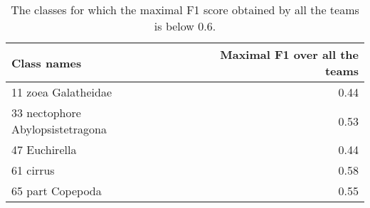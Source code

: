 
\begin{table}
\begin{tabular}{|l|r|}
Class names & Maximal F1 over all the teams \\
        \hline
11 zoea Galatheidae & 0.44\\ 
33 nectophore Abylopsistetragona & 0.53\\ 
47 Euchirella & 0.44\\ 
61 cirrus & 0.58\\ 
65 part Copepoda & 0.55
\end{tabular}
\caption{\label{table:worst_predicted} The classes for which the maximal F1 score obtained by all the teams is below $0.6$.}
\end{table}
                